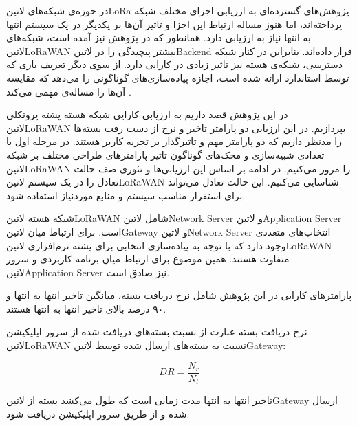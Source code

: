 
در حوزه‌ی شبکه‌های ‌لاتین{LoRa} پژوهش‌های گسترده‌ای به ارزیابی اجزای مختلف شبکه پرداخته‌اند، اما هنوز
مساله ارتباط این اجزا و تاثیر آن‌ها بر یکدیگر در یک سیستم انتها به انتها نیاز به ارزیابی دارد.
همانطور که در پژوهش  نیز آمده است، شبکه‌های ‌لاتین{LoRaWAN} بیشتر پیچیدگی را
در ‌لاتین{Backend} قرار داده‌اند. بنابراین در کنار شبکه دسترسی، شبکه‌ی هسته نیز تاثیر زیادی در کارایی دارد.
از سوی دیگر تعریف بازی که توسط استاندارد ارائه شده است، اجازه پیاده‌سازی‌های گوناگونی را می‌دهد که مقایسه آن‌ها را مساله‌ی مهمی می‌کند
.


در این پژوهش قصد داریم به ارزیابی کارایی شبکه هسته پشته پروتکلی ‌لاتین{LoRaWAN}
بپردازیم. در این ارزیابی دو پارامتر تاخیر و نرخ از دست رفت بسته‌ها را مدنظر داریم که دو پارامتر مهم
و تاثیرگذار بر تجربه کاربر هستند.
در مرحله اول با تعدادی شبیه‌سازی و محک‌های گوناگون تاثیر پارامترهای طراحی مختلف بر شبکه ‌لاتین{LoRaWAN}
را مرور می‌کنیم.
در ادامه بر اساس این ارزیابی‌ها و تئوری صف حالت تعادل را در یک سیستم ‌لاتین{LoRaWAN} شناسایی می‌کنیم.
این حالت تعادل می‌تواند برای استقرار مناسب سیستم و منابع موردنیاز استفاده شود.

شبکه هسته ‌لاتین{LoRaWAN} شامل ‌لاتین{Network Server} و ‌لاتین{Application Server} است.
برای ارتباط میان ‌لاتین{Gateway} و ‌لاتین{Network Server} انتخاب‌های متعددی وجود دارد که با توجه به پیاده‌سازی
انتخابی برای پشته نرم‌افزاری ‌لاتین{LoRaWAN} متفاوت هستند. همین موضوع برای ارتباط میان برنامه کاربردی و سرور
‌لاتین{Application Server} نیز صادق است.

پارامترهای کارایی در این پژوهش شامل نرخ دریافت بسته، میانگین تاخیر انتها به انتها و ۹۰ درصد بالای تاخیر انتها به انتها
هستند.

نرخ دریافت بسته عبارت از نسبت بسته‌های دریافت شده از سرور اپلیکیشن ‌لاتین{LoRaWAN}
نسبت به بسته‌های ارسال شده توسط ‌لاتین{Gateway}:

\[
  DR = \frac{N_{r}}{N_{t}}
\]

تاخیر انتها به انتها مدت زمانی است که طول می‌کشد بسته از ‌لاتین{Gateway} ارسال شده
و از طریق سرور اپلیکیشن دریافت شود.
